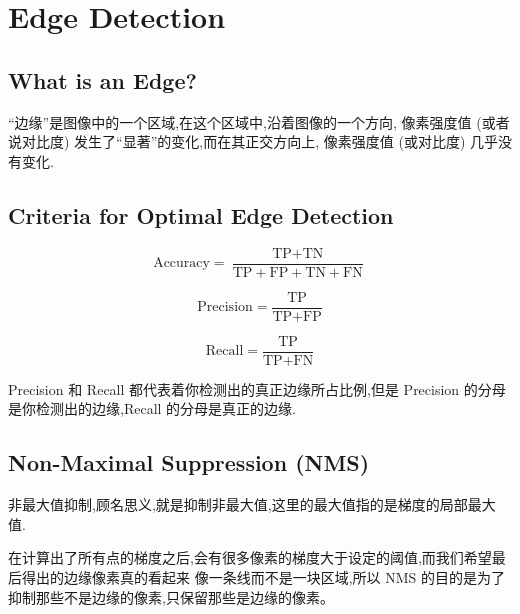 \section{Edge Detection}

\subsection{What is an Edge?}

“边缘”是图像中的一个区域,在这个区域中,沿着图像的一个方向,
像素强度值 (或者说对比度) 发生了“显著”的变化,而在其正交方向上,
像素强度值 (或对比度) 几乎没有变化.

\subsection{Criteria for Optimal Edge Detection}

\begin{equation}
\text{Accuracy}=\frac{\text{TP}+\text{TN}}{\text{TP}+\text{FP}+\text{TN}+\text{FN}} 
\end{equation}

\begin{equation}
\text{Precision}=\frac{\text{TP}}{\text{TP}+\text{FP}} 
\end{equation}

\begin{equation}
\text{Recall}=\frac{\text{TP}}{\text{TP}+\text{FN}}
\end{equation}

Precision 和 Recall 都代表着你检测出的真正边缘所占比例,但是 Precision 的分母
是你检测出的边缘,Recall 的分母是真正的边缘.

\subsection{Non-Maximal Suppression (NMS)}

非最大值抑制,顾名思义,就是抑制非最大值,这里的最大值指的是梯度的局部最大值.

在计算出了所有点的梯度之后,会有很多像素的梯度大于设定的阈值,而我们希望最后得出的边缘像素真的看起来
像一条线而不是一块区域,所以 NMS 的目的是为了抑制那些不是边缘的像素,只保留那些是边缘的像素。

